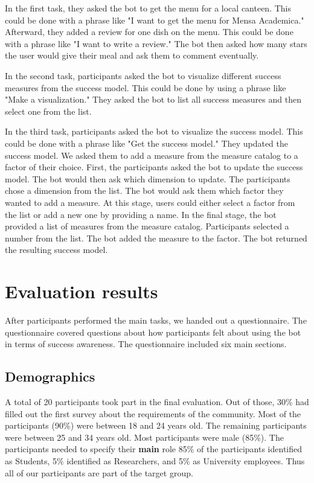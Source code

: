 In the first task, they asked the bot to get the menu for a local canteen. This could be done with a phrase like "I want to get the menu for Mensa Academica."
Afterward, they added a review for one dish on the menu. This could be done with a phrase like "I want to write a review." The bot then asked how many stars the user would give their meal and ask them to comment eventually.  

In the second task, participants asked the bot to visualize different success measures from the success model. This could be done by using a phrase like "Make a visualization." They asked the bot to list all success measures and then select one from the list.

In the third task, participants asked the bot to visualize the success model. This could be done with a phrase like "Get the success model." They updated the success model. We asked them to add a measure from the measure catalog to a factor of their choice. 
First, the participants asked the bot to update the success model. The bot would then ask which dimension to update. 
The participants chose a dimension from the list. 
The bot would ask them which factor they wanted to add a measure. 
At this stage, users could either select a factor from the list or add a new one by providing a name. 
In the final stage, the bot provided a list of measures from the measure catalog.
Participants selected a number from the list. 
The bot added the measure to the factor.
The bot returned the resulting success model.

\section{Evaluation results}

After participants performed the main tasks, we handed out a questionnaire.
The questionnaire covered questions about how participants felt about using the bot in terms of success awareness.
The questionnaire included six main sections. 

\subsection{Demographics}
A total of 20 participants took part in the final evaluation. Out of those, 30\% had filled out the first survey about the requirements of the community. 
Most of the participants (90\%) were between 18 and 24 years old. The remaining participants were between 25 and 34 years old. Most participants were male (85\%).
The participants needed to specify their \textbf{main} role 85\% of the participants identified as Students, 5\% identified as Researchers, and 5\% as University employees. Thus all of our participants are part of the target group.

